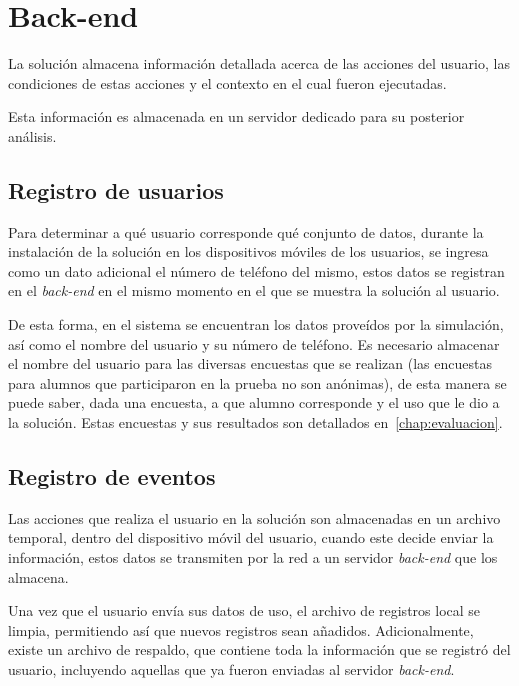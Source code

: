 \section{Back-end}

La solución almacena información detallada acerca de las acciones del usuario,
las condiciones de estas acciones y el contexto en el cual fueron ejecutadas.

Esta información es almacenada en un servidor dedicado para su posterior
análisis.

\subsection{Registro de usuarios}


Para determinar a qué usuario corresponde qué conjunto de datos, durante
la instalación de la solución en los dispositivos móviles de los usuarios, se
ingresa como un dato adicional el número de teléfono del mismo, estos datos se
registran en el \textit{back-end} en el mismo momento en el que se muestra la
solución al usuario.

De esta forma, en el sistema se encuentran los datos proveídos por la
simulación, así como el nombre del usuario y su número de teléfono. Es necesario 
almacenar el nombre del
usuario para las diversas encuestas que se realizan (las encuestas para alumnos
que participaron en la prueba no son anónimas), de esta manera se puede saber,
dada una encuesta, a que alumno corresponde y el uso que le dio a la solución.
Estas encuestas y sus resultados son detallados en~\ref{chap:evaluacion}.

\subsection{Registro de eventos}
\label{sec:backend_reg_eventos}

Las acciones que realiza el usuario en la solución son almacenadas en un archivo temporal,
dentro del dispositivo móvil del usuario, cuando este decide enviar la
información, estos datos se transmiten por la red a un servidor \textit{back-end} que los 
almacena.

Una vez que el usuario envía sus datos de uso, el archivo de registros local se
limpia, permitiendo así que nuevos registros sean añadidos. Adicionalmente,
existe un archivo de respaldo, que contiene toda la información que se registró
del usuario, incluyendo aquellas que ya fueron enviadas al servidor
\textit{back-end}.

